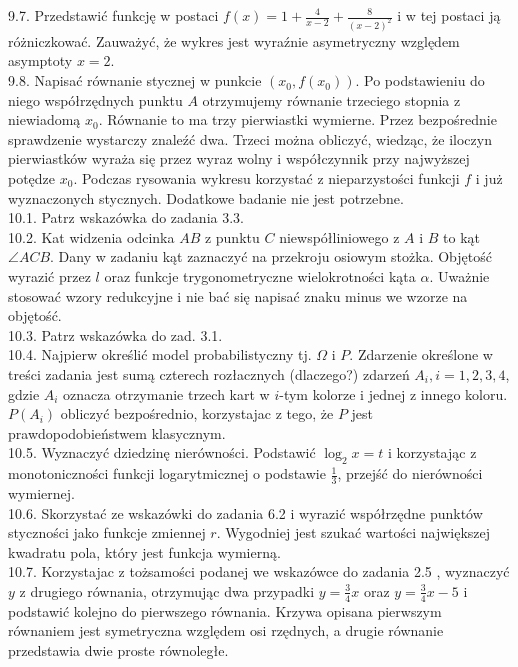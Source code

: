 \documentclass[10pt]{article}
\begin{document}
9.7. Przedstawić funkcję w postaci $f(x)=1+\frac{4}{x-2}+\frac{8}{(x-2)^{2}}$ i w tej postaci ją różniczkować. Zauważyć, że wykres jest wyraźnie asymetryczny względem asymptoty $x=2$.\\
9.8. Napisać równanie stycznej w punkcie $\left(x_{0}, f\left(x_{0}\right)\right)$. Po podstawieniu do niego współrzędnych punktu $A$ otrzymujemy równanie trzeciego stopnia z niewiadomą $x_{0}$. Równanie to ma trzy pierwiastki wymierne. Przez bezpośrednie sprawdzenie wystarczy znaleźć dwa. Trzeci można obliczyć, wiedząc, że iloczyn pierwiastków wyraża się przez wyraz wolny i współczynnik przy najwyższej potędze $x_{0}$. Podczas rysowania wykresu korzystać z nieparzystości funkcji $f$ i już wyznaczonych stycznych. Dodatkowe badanie nie jest potrzebne.\\
10.1. Patrz wskazówka do zadania 3.3.\\
10.2. Kat widzenia odcinka $A B$ z punktu $C$ niewspółliniowego z $A$ i $B$ to kąt $\angle A C B$. Dany w zadaniu kąt zaznaczyć na przekroju osiowym stożka. Objętość wyrazić przez $l$ oraz funkcje trygonometryczne wielokrotności kąta $\alpha$. Uważnie stosować wzory redukcyjne i nie bać się napisać znaku minus we wzorze na objętość.\\
10.3. Patrz wskazówka do zad. 3.1.\\
10.4. Najpierw określić model probabilistyczny tj. $\Omega$ i $P$. Zdarzenie określone w treści zadania jest sumą czterech rozłacznych (dlaczego?) zdarzeń $A_{i}, i=1,2,3,4$, gdzie $A_{i}$ oznacza otrzymanie trzech kart w $i$-tym kolorze i jednej z innego koloru. $P\left(A_{i}\right)$ obliczyć bezpośrednio, korzystajac z tego, że $P$ jest prawdopodobieństwem klasycznym.\\
10.5. Wyznaczyć dziedzinę nierówności. Podstawić $\log _{2} x=t$ i korzystając z monotoniczności funkcji logarytmicznej o podstawie $\frac{1}{3}$, przejść do nierówności wymiernej.\\
10.6. Skorzystać ze wskazówki do zadania 6.2 i wyrazić współrzędne punktów styczności jako funkcje zmiennej $r$. Wygodniej jest szukać wartości największej kwadratu pola, który jest funkcja wymierną.\\
10.7. Korzystajac z tożsamości podanej we wskazówce do zadania 2.5 , wyznaczyć $y$ z drugiego równania, otrzymując dwa przypadki $y=\frac{3}{4} x$ oraz $y=\frac{3}{4} x-5$ i podstawić kolejno do pierwszego równania. Krzywa opisana pierwszym równaniem jest symetryczna względem osi rzędnych, a drugie równanie przedstawia dwie proste równoległe.\\
\end{document}
